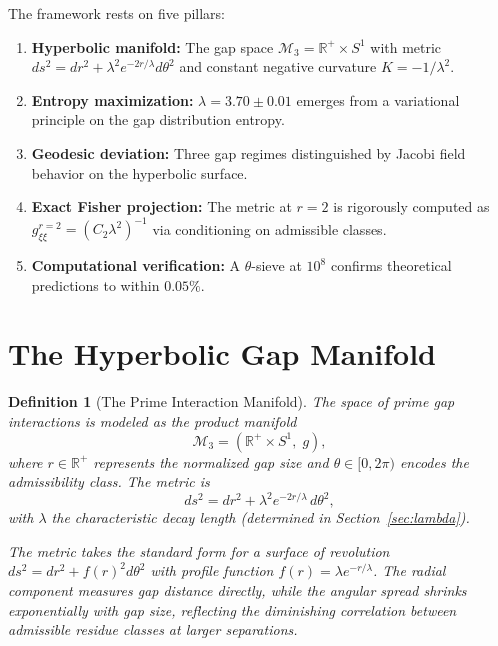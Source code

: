 \documentclass[12pt]{article}
\newtheorem{definition}[theorem]{Definition}
\begin{document}
The framework rests on five pillars:

\begin{enumerate}
  \item \textbf{Hyperbolic manifold:} The gap space $\mathcal{M}_3 = \mathbb{R}^+ \times S^1$
    with metric $ds^2 = dr^2 + \lambda^2 e^{-2r/\lambda} d\theta^2$ and constant
    negative curvature $K = -1/\lambda^2$.
  \item \textbf{Entropy maximization:} $\lambda = 3.70 \pm 0.01$ emerges from a
    variational principle on the gap distribution entropy.
  \item \textbf{Geodesic deviation:} Three gap regimes distinguished by Jacobi
    field behavior on the hyperbolic surface.
  \item \textbf{Exact Fisher projection:} The metric at $r=2$ is rigorously computed as
    $g_{\xi\xi}^{r=2} = (C_2 \lambda^2)^{-1}$ via conditioning on admissible classes.
  \item \textbf{Computational verification:} A $\theta$-sieve at $10^8$ confirms
    theoretical predictions to within $0.05\%$.
\end{enumerate}

\section{The Hyperbolic Gap Manifold}

\begin{definition}[The Prime Interaction Manifold]
The space of prime gap interactions is modeled as the product manifold
\[
  \mathcal{M}_3 = \left(\mathbb{R}^+ \times S^1,\; g\right),
\]
where $r \in \mathbb{R}^+$ represents the normalized gap size and
$\theta \in [0, 2\pi)$ encodes the admissibility class. The metric is
\begin{equation}
  ds^2 = dr^2 + \lambda^2 e^{-2r/\lambda}\, d\theta^2,
  \label{eq:metric}
\end{equation}
with $\lambda$ the characteristic decay length (determined in
Section~\ref{sec:lambda}).

The metric takes the standard form for a surface of revolution $ds^2 = dr^2 + f(r)^2 d\theta^2$
with profile function $f(r) = \lambda e^{-r/\lambda}$. The radial component measures
gap distance directly, while the angular spread shrinks exponentially with gap size,
reflecting the diminishing correlation between admissible residue classes at larger
separations.
\end{definition}
\end{document}
